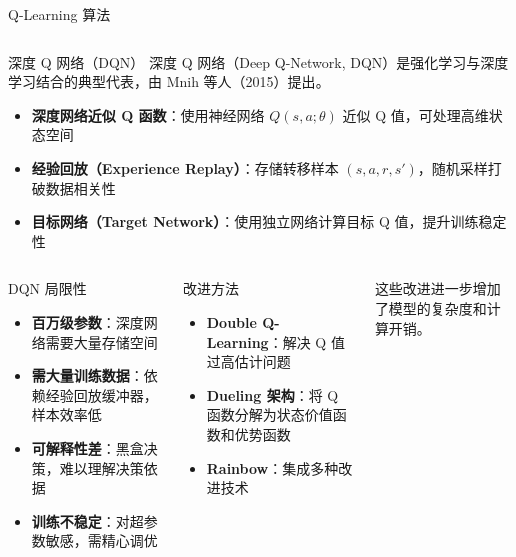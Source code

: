 {\begin{frame}{Q-Learning 算法}
\begin{columns}[T]
    \end{columns}
\end{frame}

\begin{frame}{深度 Q 网络（DQN）}
    深度 Q 网络（Deep Q-Network, DQN）是强化学习与深度学习结合的典型代表，由 Mnih 等人（2015）提出\cite{mnih2015human}。

    \scriptsize
    \begin{itemize}
        \item \textbf{深度网络近似 Q 函数}：使用神经网络 $Q(s,a;\theta)$ 近似 Q 值，可处理高维状态空间
        \item \textbf{经验回放（Experience Replay）}：存储转移样本 $(s,a,r,s')$，随机采样打破数据相关性
        \item \textbf{目标网络（Target Network）}：使用独立网络计算目标 Q 值，提升训练稳定性
    \end{itemize}

    \begin{columns}[T]
        \begin{block}{DQN 局限性}
            \scriptsize
            \begin{itemize}
                \item \textbf{百万级参数}：深度网络需要大量存储空间
                \item \textbf{需大量训练数据}：依赖经验回放缓冲器，样本效率低
                \item \textbf{可解释性差}：黑盒决策，难以理解决策依据
                \item \textbf{训练不稳定}：对超参数敏感，需精心调优
            \end{itemize}
        \end{block}

        \begin{block}{改进方法}
            \scriptsize
            \begin{itemize}
                \item \textbf{Double Q-Learning}\cite{van2016deep}：解决 Q 值过高估计问题
                \item \textbf{Dueling 架构}\cite{wang2016dueling}：将 Q 函数分解为状态价值函数和优势函数
                \item \textbf{Rainbow}\cite{hessel2018rainbow}：集成多种改进技术
            \end{itemize}
        \end{block}
        \footnotesize
            这些改进进一步增加了模型的复杂度和计算开销。
    \end{columns}
\end{frame}

}
